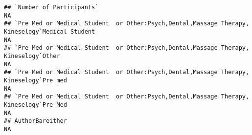 \documentclass[]{article}
\begin{document}
\begin{verbatim}
## `Number of Participants`                                                                                                                                                                                                                                                                                                                                                                                                                                                              NA
## `Pre Med or Medical Student  or Other:Psych,Dental,Massage Therapy, Kineselogy`Medical Student                                                                                                                                                                                                                                                                                                                                                                                        NA
## `Pre Med or Medical Student  or Other:Psych,Dental,Massage Therapy, Kineselogy`Other                                                                                                                                                                                                                                                                                                                                                                                                  NA
## `Pre Med or Medical Student  or Other:Psych,Dental,Massage Therapy, Kineselogy`Pre med                                                                                                                                                                                                                                                                                                                                                                                                NA
## `Pre Med or Medical Student  or Other:Psych,Dental,Massage Therapy, Kineselogy`Pre Med                                                                                                                                                                                                                                                                                                                                                                                                NA
## AuthorBareither                                                                                                                                                                                                                                                                                                                                                                                                                                                                       NA

\end{verbatim}
\end{document}
